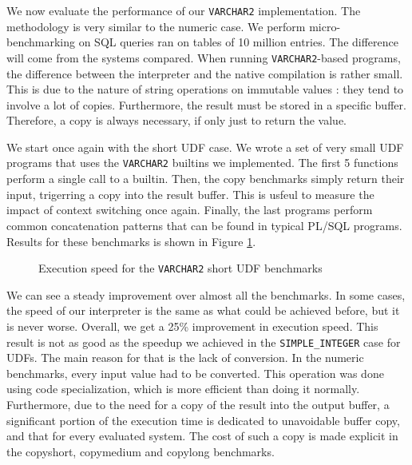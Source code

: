 \documentclass[twoside,11pt,a4paper]{article}
\newcommand{\pls}[1]{\small\texttt{#1}\normalsize}
\newcommand{\plstype}[1]{\pls{#1}}
\newcommand{\varchar}{\plstype{VARCHAR2}}
\newcommand{\simpleint}{\plstype{SIMPLE\_INTEGER}}
\newcommand{\bench}[1]{\textsf{#1}}
\begin{document}
We now evaluate the performance of our \varchar{} implementation. The methodology is very similar to the numeric case. We perform micro-benchmarking on SQL queries ran on tables of 10 million entries. The difference will come from the systems compared. When running \varchar{}-based programs, the difference between the interpreter and the native compilation is rather small. This is due to the nature of string operations on immutable values : they tend to involve a lot of copies. Furthermore, the result must be stored in a specific buffer. Therefore, a copy is always necessary, if only just to return the value.

We start once again with the short UDF case. We wrote a set of very small UDF programs that uses the \varchar{} builtins we implemented. The first 5 functions perform a single call to a builtin. Then, the \bench{copy} benchmarks simply return their input, trigerring a copy into the result buffer. This is usfeul to measure the impact of context switching once again. Finally, the last programs perform common concatenation patterns that can be found in typical PL/SQL programs. Results for these benchmarks is shown in Figure \ref{fig:exp3a}.

\begin{figure}[tp]
	\centering
	\caption{Execution speed for the \varchar{} short UDF benchmarks}
	\label{fig:exp3a}
\end{figure}

We can see a steady improvement over almost all the benchmarks. In some cases, the speed of our interpreter is the same as what could be achieved before, but it is never worse. Overall, we get a 25\% improvement in execution speed. This result is not as good as the speedup we achieved in the \simpleint{} case for UDFs. The main reason for that is the lack of conversion. In the numeric benchmarks, every input value had to be converted. This operation was done using code specialization, which is more efficient than doing it normally. Furthermore, due to the need for a copy of the result into the output buffer, a significant portion of the execution time is dedicated to unavoidable buffer copy, and that for every evaluated system. The cost of such a copy is made explicit in the \bench{copyshort}, \bench{copymedium} and \bench{copylong} benchmarks.
\end{document}
